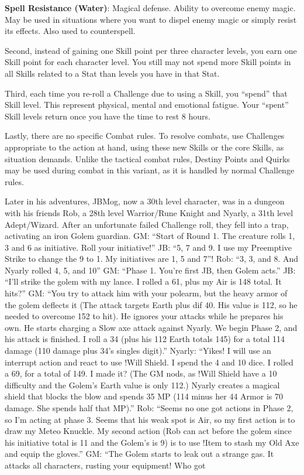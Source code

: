 \begin{multicols}{2}
\textbf{Spell Resistance (Water)}: Magical defense.
Ability to overcome enemy magic. May be used
in situations where you want to dispel enemy
magic or simply resist its effects. Also used to
counterspell.

Second, instead of gaining one Skill point
per three character levels, you earn one Skill
point for each character level. You still may not
spend more Skill points in all Skills related to a
Stat than levels you have in that Stat.

Third, each time you re-roll a Challenge
due to using a Skill, you “spend” that Skill level.
This represent physical, mental and emotional
fatigue. Your “spent” Skill levels return once you
have the time to rest 8 hours.

Lastly, there are no specific Combat rules.
To resolve combats, use Challenges appropriate
to the action at hand, using these new Skills or
the core Skills, as situation demands. Unlike the
tactical combat rules, Destiny Points and Quirks
may be used during combat in this variant, as it
is handled by normal Challenge rules.

Later in his adventures, JBMog, now a 30th level character,
was in a dungeon with his friends Rob, a 28th level
Warrior/Rune Knight and Nyarly, a 31th level
Adept/Wizard. After an unfortunate failed Challenge roll,
they fell into a trap, activating an iron Golem guardian.
GM: “Start of Round 1. The creature rolls 1, 3 and
6 as initiative. Roll your initiative!”
JB: “5, 7 and 9. I use my Preemptive Strike to
change the 9 to 1. My initiatives are 1, 5 and 7”!
Rob: “3, 3, and 8. And Nyarly rolled 4, 5, and 10”
GM: “Phase 1. You're first JB, then Golem acts.”
JB: “I'll strike the golem with my lance. I rolled a
61, plus my Air is 148 total. It hits?”
GM: “You try to attack him with your polearm,
but the heavy armor of the golem deflects it (The attack
targets Earth plus dif 40. His value is 112, so he needed
to overcome 152 to hit). He ignores your attacks while he
prepares his own. He starts charging a Slow axe attack
against Nyarly. We begin Phase 2, and his attack is
finished. I roll a 34 (plus his 112 Earth totals 145) for a
total 114 damage (110 damage plus 34's singles digit).”
Nyarly: “Yikes! I will use an interrupt action and
react to use !Will Shield. I spend the 4 and 10 dice. I
rolled a 69, for a total of 149. I made it? (The GM nods,
as !Will Shield have a 10 difficulty and the Golem's Earth
value is only 112.) Nyarly creates a magical shield that
blocks the blow and spends 35 MP (114 minus her 44
Armor is 70 damage. She spends half that MP).”
Rob: “Seems no one got actions in Phase 2, so I'm
acting at phase 3. Seems that his weak spot is Air, so my
first action is to draw my Meteo Knuckle. My second
action (Rob can act before the golem since his initiative
total is 11 and the Golem's is 9) is to use !Item to stash
my Old Axe and equip the gloves.”
GM: “The Golem starts to leak out a strange gas.
It attacks all characters, rusting your equipment! Who got


\end{multicols}
